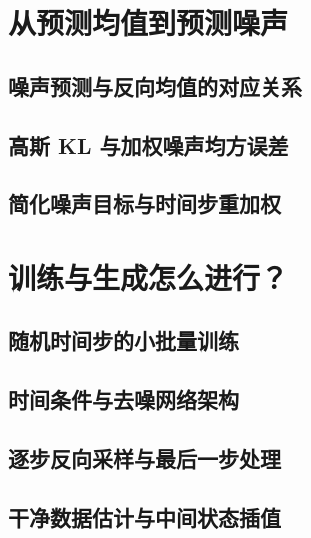 \section{从预测均值到预测噪声}
\label{sec:diffusion-noise-prediction}
\contentplaceholder

\subsection{噪声预测与反向均值的对应关系}
\label{subsec:diffusion-mean}
\contentplaceholder

\subsection{高斯 KL 与加权噪声均方误差}
\label{subsec:diffusion-weighted-mse}
\contentplaceholder

\subsection{简化噪声目标与时间步重加权}
\label{subsec:diffusion-simple-loss}
\contentplaceholder

\section{训练与生成怎么进行？}
\label{sec:diffusion-algorithms}
\contentplaceholder

\subsection{随机时间步的小批量训练}
\label{subsec:diffusion-training}
\contentplaceholder

\subsection{时间条件与去噪网络架构}
\label{subsec:diffusion-network}
\contentplaceholder

\subsection{逐步反向采样与最后一步处理}
\label{subsec:diffusion-sampling}
\contentplaceholder

\subsection{干净数据估计与中间状态插值}
\label{subsec:diffusion-clean-estimate}
\contentplaceholder

